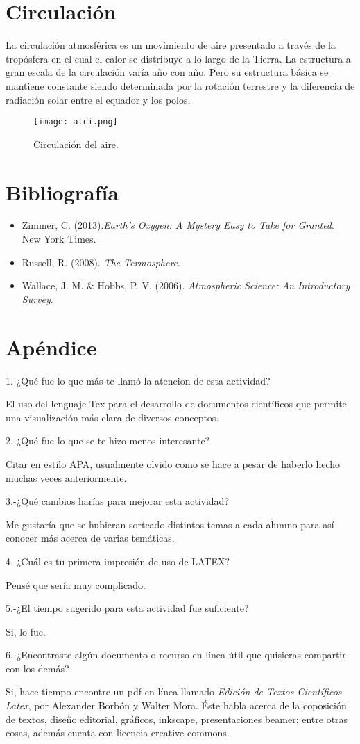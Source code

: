 \documentclass{article}
\begin{document}
\section{Circulación}
La circulación atmosférica es un movimiento de aire presentado a través de la tropósfera en el cual el calor se distribuye a lo largo de la Tierra. La estructura a gran escala de la circulación varía año con año. Pero su estructura básica se mantiene constante siendo determinada por la rotación terrestre y la diferencia de radiación solar entre el equador y los polos.

\begin{figure}[h!]
    \texttt{[image: atci.png]}
    \caption{Circulación del aire.}
\end{figure}

\section{Bibliografía}

\begin{itemize}
\item Zimmer, C. (2013).\textit{Earth's Oxygen: A Mystery Easy to Take for Granted}. New York Times.
\item Russell, R. (2008). \textit{The Termosphere}.
\item Wallace, J. M. & Hobbs, P. V. (2006). \textit{Atmospheric Science: An Introductory Survey}.
\end{itemize}

\section{Apéndice}
1.-¿Qué fue lo que más te llamó la atencion de esta actividad?

El uso del lenguaje Tex para el desarrollo de documentos científicos que permite una visualización más clara de diversos conceptos.

2.-¿Qué fue lo que se te hizo menos interesante?

Citar en estilo APA, usualmente olvido como se hace a pesar de haberlo hecho muchas veces anteriormente.

3.-¿Qué cambios harías para mejorar esta actividad?

Me gustaría que se hubieran sorteado distintos temas a cada alumno para así conocer más acerca de varias temáticas.

4.-¿Cuál es tu primera impresión de uso de LATEX?

Pensé que sería muy complicado.

5.-¿El tiempo sugerido para esta actividad fue suficiente?

Si, lo fue.

6.-¿Encontraste algún documento o recurso en línea útil que quisieras compartir con los demás?

Si, hace tiempo encontre un pdf en línea llamado \textit{Edición de Textos Científicos Latex}, por Alexander Borbón y Walter Mora. Éste habla acerca de la coposición de textos, diseño editorial, gráficos, inkscape, presentaciones beamer; entre otras cosas, además cuenta con licencia creative commons.
\end{document}
